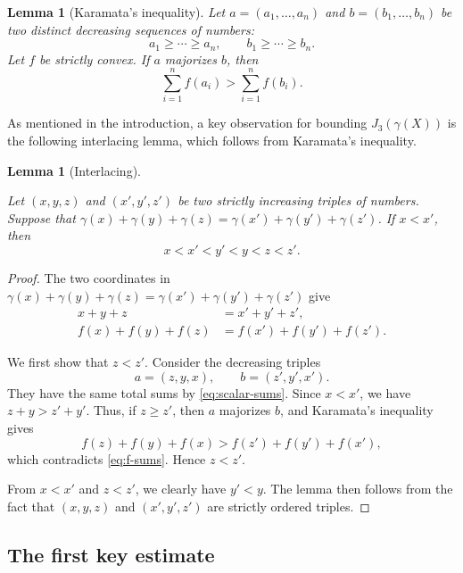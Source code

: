 \documentclass{amsart}
\numberwithin{equation}{section}
\newtheorem{lemma}[theorem]{Lemma}
\begin{document}
\begin{lemma}[Karamata's inequality]
    \label{karamata}
    Let $a=(a_1,\dots,a_n)$ and $b=(b_1,\dots,b_n)$ be two distinct decreasing sequences of numbers:
    \[
    a_1\ge \cdots\ge a_n,
    \qquad
    b_1\ge \cdots\ge b_n.
    \]
    Let $f$ be strictly convex.
    If $a$ majorizes $b$, then
    \[
    \sum_{i=1}^n f(a_i)>
    \sum_{i=1}^n f(b_i).
    \]
\end{lemma}


\medskip 

As mentioned in the introduction, a key observation for bounding $J_3(\gamma(X))$ is the following interlacing lemma, which follows from Karamata's inequality.

\begin{lemma}[Interlacing]
    \label{interlacing-lem}
    
    Let $(x,y,z)$ and $(x',y',z')$ be two strictly increasing triples of numbers.
    Suppose that $\gamma(x)+\gamma(y)+\gamma(z)=\gamma(x')+\gamma(y')+\gamma(z')$.
    If $x<x'$, then
    \[
    x<x'<y'<y<z<z'.
    \]
\end{lemma}

\begin{proof}
    The two coordinates in $\gamma(x)+\gamma(y)+\gamma(z)=\gamma(x')+\gamma(y')+\gamma(z')$ give
    \begin{align}
        x+y+z
        &=x'+y'+z', \label{eq:scalar-sums}\\
        f(x)+f(y)+f(z)
        &=f(x')+f(y')+f(z'). \label{eq:f-sums}
    \end{align}
    
    We first show that $z<z'$. 
    Consider the decreasing triples
    \[
    a=(z,y,x),
    \qquad
    b=(z',y',x').
    \]
    They have the same total sums by \eqref{eq:scalar-sums}. 
    Since $x<x'$, we have $z+y>z'+y'$.
    Thus, if $z\geq z'$, then $a$ majorizes $b$, and Karamata's inequality gives
    \[
    f(z)+f(y)+f(x)
    >
    f(z')+f(y')+f(x'),
    \]
    which contradicts \eqref{eq:f-sums}. 
    Hence $z<z'$.
    
    From $x<x'$ and $z<z'$, we clearly have $y'<y$.
    The lemma then follows from the fact that $(x,y,z)$ and $(x',y',z')$ are strictly ordered triples.
    \qedhere
    
    
\end{proof}


\bigskip 


\subsection{The first key estimate}
\end{document}
